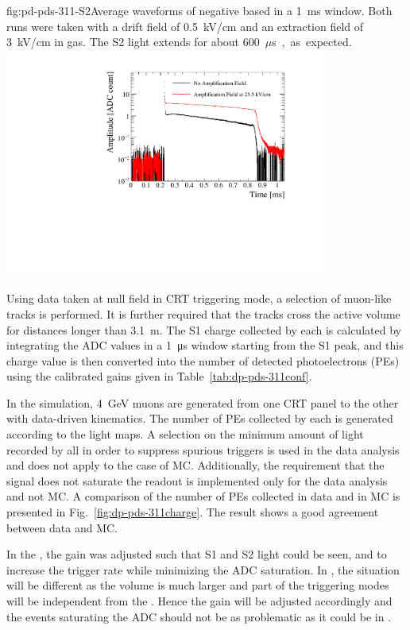 \begin{dunefigure}{fig:pd-pds-311-S2}{Average waveforms of negative based  in a \SI{1}{ms} window. Both runs were taken with a drift field of \SI{0.5}{kV/cm} and an extraction field of \SI{3}{kV/cm} in gas. The S2 light extends for about \SI{600}{$\mu$s}, as expected.}
\includegraphics[width=0.8\textwidth]{graphics/dppd_311_S2_extraction.pdf}
\end{dunefigure}
Using data taken at null field in CRT triggering mode, a selection of muon-like tracks is performed. It is further required that the tracks cross the active volume for distances longer than \SI{3.1}{\m}. 
The S1 charge collected by each  is calculated by integrating the ADC values in a \SI{1}{\us} window starting from the S1 peak, and this charge value is then converted into the number of detected photoelectrons (PEs) using the calibrated  gains given in Table~\ref{tab:dp-pds-311conf}.

In the simulation, \SI{4}{\GeV} muons are generated from one CRT panel to the other with data-driven kinematics. The number of PEs collected by each  is generated according to the light maps. A selection on the minimum amount of light recorded by all  in order to suppress spurious triggers is used in the data analysis and does not apply to the case of MC. Additionally, the requirement that the  signal does not saturate the readout is implemented only for the data analysis and not MC. A comparison of the number of PEs collected in data and in MC is presented in Fig.~\ref{fig:dp-pds-311charge}. The result shows a good agreement between data and MC.

In the , the  gain was adjusted such that S1 and S2 light could be seen, and to increase the trigger rate while minimizing the  ADC saturation. 
In \dune \dual, the situation will be different as the volume is much larger and part of the triggering modes will be independent from the . 
Hence the  gain will be adjusted accordingly and the events saturating the ADC should not be as problematic as it could be in .

